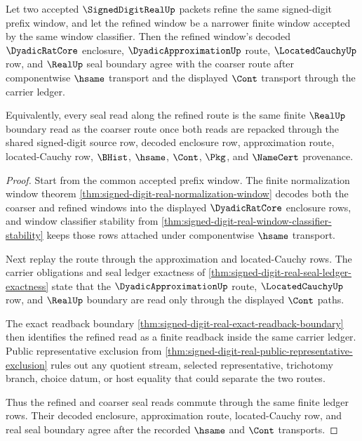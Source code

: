 \begin{theorem}
\label{thm:signed-digit-real-prefix-refinement-seal-commutes}
Let two accepted $\SignedDigitRealUp$ packets refine the same signed-digit prefix window, and let the refined window be a narrower finite window accepted by the same window classifier. Then the refined window's decoded $\DyadicRatCore$ enclosure, $\DyadicApproximationUp$ route, $\LocatedCauchyUp$ row, and $\RealUp$ seal boundary agree with the coarser route after componentwise $\hsame$ transport and the displayed $\Cont$ transport through the carrier ledger.

Equivalently, every seal read along the refined route is the same finite $\RealUp$ boundary read as the coarser route once both reads are repacked through the shared signed-digit source row, decoded enclosure row, approximation route, located-Cauchy row, $\BHist$, $\hsame$, $\Cont$, $\Pkg$, and $\NameCert$ provenance.
\end{theorem}
\begin{proof}
Start from the common accepted prefix window. The finite normalization window theorem \autoref{thm:signed-digit-real-normalization-window} decodes both the coarser and refined windows into the displayed $\DyadicRatCore$ enclosure rows, and window classifier stability from \autoref{thm:signed-digit-real-window-classifier-stability} keeps those rows attached under componentwise $\hsame$ transport.

Next replay the route through the approximation and located-Cauchy rows. The carrier obligations and seal ledger exactness of \autoref{thm:signed-digit-real-seal-ledger-exactness} state that the $\DyadicApproximationUp$ route, $\LocatedCauchyUp$ row, and $\RealUp$ boundary are read only through the displayed $\Cont$ paths.

The exact readback boundary \autoref{thm:signed-digit-real-exact-readback-boundary} then identifies the refined read as a finite readback inside the same carrier ledger. Public representative exclusion from \autoref{thm:signed-digit-real-public-representative-exclusion} rules out any quotient stream, selected representative, trichotomy branch, choice datum, or host equality that could separate the two routes.

Thus the refined and coarser seal reads commute through the same finite ledger rows. Their decoded enclosure, approximation route, located-Cauchy row, and real seal boundary agree after the recorded $\hsame$ and $\Cont$ transports.
\end{proof}

